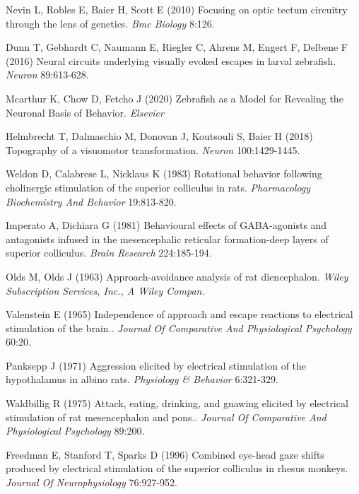 \documentclass{ar-1col}
\begin{document}
{\begin{thebibliography}{00}
Nevin L, Robles E, Baier H, Scott E (2010) 
Focusing on optic tectum circuitry through the lens of genetics.
\textit{ Bmc Biology} 8:126.

Dunn T, Gebhardt C, Naumann E, Riegler C, Ahrens M, Engert F, Delbene F (2016) 
Neural circuits underlying visually evoked escapes in larval zebrafish.
\textit{ Neuron} 89:613-628.

Mcarthur K, Chow D, Fetcho J (2020) 
Zebrafish as a Model for Revealing the Neuronal Basis of Behavior.
\textit{ Elsevier}

Helmbrecht T, Dalmaschio M, Donovan J, Koutsouli S, Baier H (2018) 
Topography of a visuomotor transformation.
\textit{ Neuron} 100:1429-1445.

Weldon D, Calabrese L, Nicklaus K (1983) 
Rotational behavior following cholinergic stimulation of the superior colliculus in rats.
\textit{ Pharmacology Biochemistry And Behavior} 19:813-820.

Imperato A, Dichiara G (1981) 
Behavioural effects of GABA-agonists and antagonists infused in the mesencephalic reticular formation-deep layers of superior colliculus.
\textit{ Brain Research} 224:185-194.

Olds M, Olds J (1963) 
Approach-avoidance analysis of rat diencephalon.
\textit{ Wiley Subscription Services, Inc., A Wiley Compan.}

Valenstein E (1965) 
Independence of approach and escape reactions to electrical stimulation of the brain..
\textit{ Journal Of Comparative And Physiological Psychology} 60:20.

Panksepp J (1971) 
Aggression elicited by electrical stimulation of the hypothalamus in albino rats.
\textit{ Physiology \& Behavior} 6:321-329.

Waldbillig R (1975) 
Attack, eating, drinking, and gnawing elicited by electrical stimulation of rat mesencephalon and pons..
\textit{ Journal Of Comparative And Physiological Psychology} 89:200.

Freedman E, Stanford T, Sparks D (1996) 
Combined eye-head gaze shifts produced by electrical stimulation of the superior colliculus in rhesus monkeys.
\textit{ Journal Of Neurophysiology} 76:927-952.


\end{thebibliography}}
\end{document}
